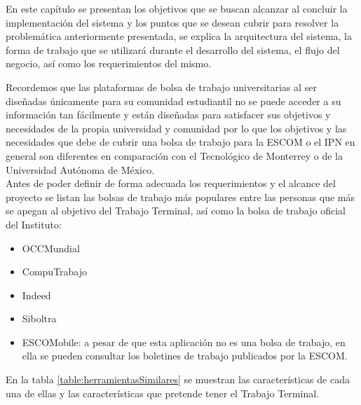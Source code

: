 En este capítulo se presentan los objetivos que se buscan alcanzar al concluir la implementación del sistema y los puntos que se desean cubrir para resolver la problemática anteriormente presentada, se 
explica la arquitectura del sistema, la forma de trabajo que se utilizará durante el desarrollo del sistema, el flujo del negocio, así como los requerimientos del mismo.\\
\newline

Recordemos que las plataformas de bolsa de trabajo universitarias al ser diseñadas únicamente para su comunidad estudiantil no se puede acceder 
a su información tan fácilmente y están diseñadas para satisfacer sus objetivos y necesidades de la propia universidad y comunidad por lo que los objetivos y las necesidades que debe de cubrir una bolsa de trabajo para la ESCOM o  el IPN en general son diferentes en comparación con el Tecnológico de Monterrey o de la Universidad Autónoma de México.\\
\newline
Antes de poder definir de forma adecuada los requerimientos y el alcance del proyecto se listan las bolsas de trabajo más populares entre las personas que más se apegan al objetivo del Trabajo Terminal, así como  la bolsa de trabajo oficial del Instituto:
\begin{itemize}
    \item OCCMundial
    \item CompuTrabajo
    \item Indeed
    \item Siboltra 
    \item ESCOMobile: a pesar de que esta aplicación no es una bolsa de trabajo, en ella se pueden consultar los boletines de trabajo
    publicados por la ESCOM.
\end{itemize}
En la tabla \ref{table:herramientasSimilares} se muestran las características de cada una de ellas y las características que pretende tener el Trabajo Terminal.


